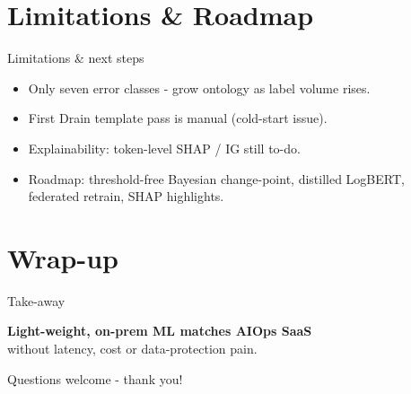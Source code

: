 \documentclass[14pt,aspectratio=169,draft]{beamer}
\begin{document}
\section{Limitations \& Roadmap}
\begin{frame}{Limitations \& next steps}
\begin{itemize}[<+->]
  \item Only seven error classes - grow ontology as label volume rises.
  \item First Drain template pass is manual (cold-start issue).
  \item Explainability: token-level SHAP / IG still to-do.
  \item Roadmap: threshold-free Bayesian change-point, distilled LogBERT, federated retrain, SHAP highlights.
\end{itemize}
\end{frame}

\section{Wrap-up}
\begin{frame}{Take-away}
\vspace{1em}
\begin{center}
\Large
\textbf{Light-weight, on-prem ML matches AIOps SaaS}\\[0.4em]
without latency, cost or data-protection pain.
\end{center}

\vspace{1.2em}
\begin{center}
\small
Questions welcome - thank you!
\end{center}
\end{frame}
\end{document}
